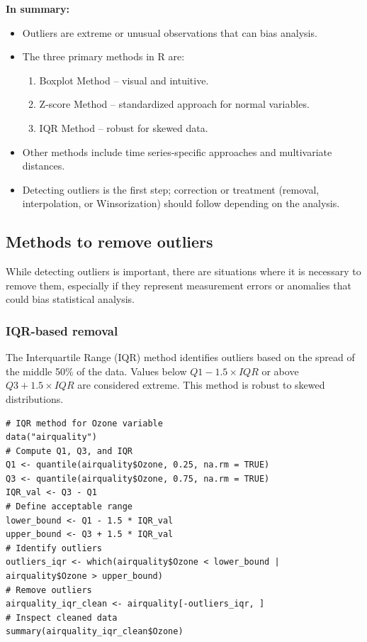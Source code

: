\documentclass[12pt,a4paper]{article}
\begin{document}
\textbf{In summary:}
\begin{itemize}
    \item Outliers are extreme or unusual observations that can bias analysis.
    \item The three primary methods in R are:
    \begin{enumerate}
        \item Boxplot Method – visual and intuitive.
        \item Z-score Method – standardized approach for normal variables.
        \item IQR Method – robust for skewed data.
    \end{enumerate}
    \item Other methods include time series-specific approaches and multivariate distances.
    \item Detecting outliers is the first step; correction or treatment (removal, interpolation, or Winsorization) should follow depending on the analysis.
\end{itemize}

\subsection{Methods to remove outliers}

While detecting outliers is important, there are situations where it is necessary to remove them, especially if they represent measurement errors or anomalies that could bias statistical analysis.

\subsubsection{IQR-based removal}

The Interquartile Range (IQR) method identifies outliers based on the spread of the middle 50\% of the data. Values below \(Q1 - 1.5 \times IQR\) or above \(Q3 + 1.5 \times IQR\) are considered extreme. This method is robust to skewed distributions.

\begin{verbatim}
# IQR method for Ozone variable
data("airquality")
# Compute Q1, Q3, and IQR
Q1 <- quantile(airquality$Ozone, 0.25, na.rm = TRUE)
Q3 <- quantile(airquality$Ozone, 0.75, na.rm = TRUE)
IQR_val <- Q3 - Q1
# Define acceptable range
lower_bound <- Q1 - 1.5 * IQR_val
upper_bound <- Q3 + 1.5 * IQR_val
# Identify outliers
outliers_iqr <- which(airquality$Ozone < lower_bound | airquality$Ozone > upper_bound)
# Remove outliers
airquality_iqr_clean <- airquality[-outliers_iqr, ]
# Inspect cleaned data
summary(airquality_iqr_clean$Ozone)
\end{verbatim}
\end{document}
